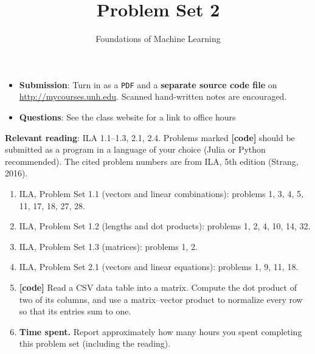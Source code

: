 \documentclass[letterpaper]{article}
\title{Problem Set 2}
\author{Foundations of Machine Learning}
\date{}
\begin{document}
\maketitle

\begin{itemize}
\item \textbf{Submission}: Turn in as a \texttt{PDF} and a \textbf{separate source code file} on \url{http://mycourses.unh.edu}. Scanned hand-written notes are encouraged.
\item \textbf{Questions}: See the class website for a link to office hours
\end{itemize}


\textbf{Relevant reading}: ILA 1.1--1.3, 2.1, 2.4. Problems marked \textbf{[code]} should be submitted as a program in a language of your choice (Julia or Python recommended). The cited problem numbers are from ILA, 5th edition (Strang, 2016).

\begin{enumerate}
\item ILA, Problem Set 1.1 (vectors and linear combinations): problems 1, 3, 4, 5, 11, 17, 18, 27, 28.
\item ILA, Problem Set 1.2 (lengths and dot products): problems 1, 2, 4, 10, 14, 32.
\item ILA, Problem Set 1.3 (matrices): problems 1, 2.
\item ILA, Problem Set 2.1 (vectors and linear equations): problems 1, 9, 11, 18.
\item \textbf{[code]} Read a CSV data table into a matrix. Compute the dot product of two of its columns, and use a matrix--vector product to normalize every row so that its entries sum to one.
\item \textbf{Time spent.} Report approximately how many hours you spent completing this problem set (including the reading).
\end{enumerate}
\end{document}
